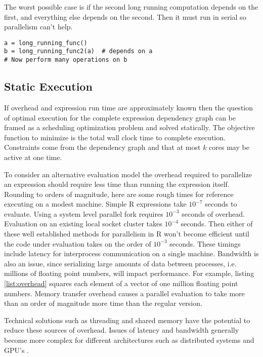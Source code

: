 \documentclass[12pt]{article}
\begin{document}
The worst possible case is if the second long running computation depends
on the first, and everything else depends on the second. Then it must run
in serial so parallelism can't help.

\begin{verbatim}
a = long_running_func()
b = long_running_func2(a)  # depends on a
# Now perform many operations on b
\end{verbatim}

\subsection{Static Execution}
\label{sec:static}

If overhead and expression run time are approximately known then the
question of optimal execution for the complete expression dependency graph
can be framed as a scheduling optimization problem and solved statically.
The objective function to minimize is the total wall clock time to complete
execution. Constraints come from the dependency graph and that at most $k$
cores may be active at one time.

To consider an alternative evaluation model the overhead required to
parallelize an expression should require less time than running the
expression itself. Rounding to orders of magnitude, here are some rough
times for reference executing on a modest machine. Simple R expressions
take $10^{-7}$ seconds to evaluate. Using a system level parallel fork
requires $10^{-3}$ seconds of overhead. Evaluation on an existing local
socket cluster takes $10^{-4}$ seconds. Then either of these well
established methods for parallelism in R won't become efficient until the
code under evaluation takes on the order of $10^{-3}$ seconds.
These timings include latency for interprocess communication on a single
machine. Bandwidth is also an issue, since serializing large amounts of
data between processes, i.e. millions of floating point numbers, will impact
performance. For example, listing \ref{list:overhead} squares each element
of a vector of one million floating point numbers. Memory transfer overhead causes
a parallel evaluation to take more than an order of magnitude more time
than the regular version. 

Technical solutions such as threading and shared
memory have the potential to reduce these sources of overhead.
Issues of latency and bandwidth generally become more complex for different
architectures such as distributed systems and GPU's
\cite{matloff2015parallel}.
\end{document}

